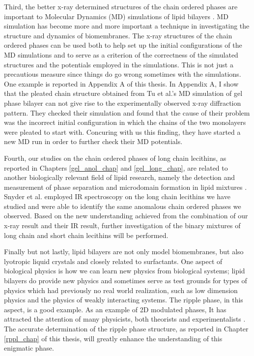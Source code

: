 Third, the better x-ray determined structures of the chain ordered phases 
are important to Molecular Dynamics (MD) simulations of lipid 
bilayers \cite{Tu96}. MD simulation has become more and more important
a technique in investigating the structure and dynamics of biomembranes. 
The x-ray structures of the chain ordered phases can be used both to help 
set up the initial configurations of the MD simulations and to serve as a 
criterion of the correctness of the simulated structures and the potentials 
employed in the simulations. This is not just a precautious measure since
things do go wrong sometimes with the simulations. One example is reported
in Appendix A of this thesis. In Appendix A, I show that the pleated
chain structure obtained from Tu et al.'s \cite{Tu96} MD simulation
of gel phase bilayer can not give rise to the experimentally observed
x-ray diffraction pattern. They checked their simulation and
found that the cause of their problem was the incorrect initial configuration 
in which the chains of the two monolayers were pleated to start with.
Concuring with us this finding, they have started a new MD run in
order to further check their MD potentials.

Fourth, our studies on the chain ordered phases of long chain lecithins,
as reported in Chapters \ref{gel_anol_chap} and \ref{gel_long_chap}, are
related to another biologically relevant field of lipid research, namely
the detection and measurement of phase separation and microdomain formation
in lipid mixtures \cite{Sny95}. Snyder et al. \cite{Sny96} employed IR
spectroscopy on the long chain lecithins we have studied and were able to
identify the same anomalous chain ordered phases we observed. Based on 
the new understanding achieved from the combination of our x-ray result 
and their IR result, further investigation of the binary mixtures of long 
chain and short chain lecithins will be performed.

Finally but not lastly, lipid bilayers are not only model biomembranes,
but also lyotropic liquid crystals and closely related to surfactants. 
One aspect of biological physics is how we can learn new physics from
biological systems; lipid bilayers do provide new physics and sometimes
serve as test grounds for types of physics which had previously no real world 
realization, such as low dimension physics and the physics of weakly 
interacting systems. The ripple phase, in this aspect, is a good example.  
As an example of 2D modulated phases, It has attracted the attention of many 
physicists, both theorists and experimentalists 
\cite{Don79,Mar84,Haw86,Car87,Gol88,McCu90,Hon91,Lub93,Sir88,Wac89a}.
The accurate determination of the ripple phase structure, as reported
in Chapter \ref{rppl_chap} of this thesis, will greatly enhance the
understanding of this enigmatic phase.
